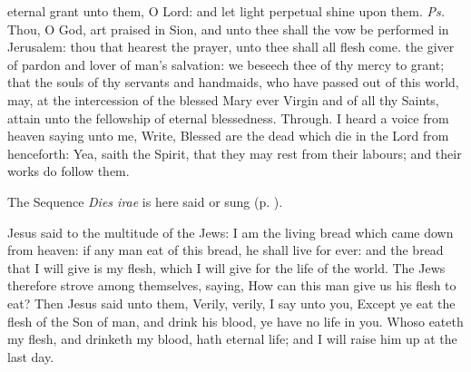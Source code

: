 \introit
{} eternal grant unto them, O Lord: and let light perpetual shine upon them. \textit{Ps.} Thou, O God, art praised in Sion, and unto thee shall the vow be performed in Jerusalem: thou that hearest the prayer, unto thee shall all flesh come.
\collect
{} the giver of pardon and lover of man's salvation: we beseech thee of thy mercy to grant; that the souls of thy servants and handmaids, who have passed out of this world, may, at the intercession of the blessed Mary ever Virgin and of all thy Saints, attain unto the fellowship of eternal blessedness. Through.
 I heard a voice from heaven saying unto me, Write, Blessed are the dead which die in the Lord from henceforth: Yea, saith the Spirit, that they may rest from their labours; and their works do follow them.
\begin{rubric}
    The Sequence \emph{Dies irae} is here said or sung (p. \pageref{diesirae}).
\end{rubric}
 Jesus said to the multitude of the Jews: I am the living bread which came down from heaven: if any man eat of this bread, he shall live for ever: and the bread that I will give is my flesh, which I will give for the life of the world. The Jews therefore strove among themselves, saying, How can this man give us his flesh to eat? Then Jesus said unto them, Verily, verily, I say unto you, Except ye eat the flesh of the Son of man, and drink his blood, ye have no life in you. Whoso eateth my flesh, and drinketh my blood, hath eternal life; and I will raise him up at the last day.
